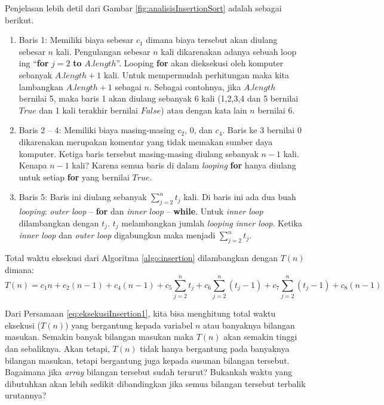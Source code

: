 \FloatBarrier
Penjelasan lebih detil dari Gambar \ref{fig:analisisInsertionSort} adalah sebagai berikut.
\begin{enumerate}
	\item Baris 1: Memiliki biaya sebesar $c_1$ dimana biaya tersebut akan diulang sebesar $n$ kali. Pengulangan sebesar $n$ kali dikarenakan adanya sebuah loop	ing ``\textbf{for} $j=2$ \textbf{to} $A.length$''. Looping \textbf{for} akan dieksekusi oleh komputer sebanyak $A.length+1$ kali. Untuk mempermudah perhitungan maka kita lambangkan $A.length+1$ sebagai $n$. Sebagai contohnya, jika $A.length$ bernilai 5, maka baris 1 akan diulang sebanyak 6 kali (1,2,3,4 dan 5 bernilai $True$ dan 1 kali terakhir bernilai $False$) atau dengan kata lain $n$ bernilai 6.
	\item Baris 2 -- 4: Memiliki biaya masing-masing $c_{2}$, 0, dan $c_{4}$. Baris ke 3 bernilai 0 dikarenakan merupakan komentar yang tidak memakan sumber daya komputer. Ketiga baris tersebut masing-masing diulang sebanyak $n-1$ kali. Kenapa $n-1$ kali? Karena semua baris di dalam \textit{looping} \textbf{for} hanya diulang untuk setiap \textbf{for} yang bernilai $True$.
	\item Baris 5: Baris ini diulang sebanyak $\sum\limits_{j=2}^n t_{j}$ kali. Di baris ini ada dua buah \textit{looping}: \textit{outer loop} -- \textbf{for} dan \textit{inner loop} -- \textbf{while}. Untuk \textit{inner loop} dilambangkan dengan $t_{j}$. $t_{j}$ melambangkan jumlah \textit{looping inner loop}. Ketika \textit{inner loop} dan \textit{outer loop} digabungkan maka menjadi $\sum\limits_{j=2}^n t_{j}$.  
\end{enumerate}                                       
                                     
Total waktu eksekusi dari Algoritma \ref{algo:insertion} dilambangkan dengan $T(n)$ dimana:
\begin{equation}
\label{eq:eksekusiInsertion1}
T(n) = c_{1}n + c_{2}(n-1) + c_{4}(n-1) + c_{5}\sum\limits_{j=2}^n t_{j} + c_{6}\sum\limits_{j=2}^n (t_{j}-1) + c_{7}\sum\limits_{j=2}^n (t_{j}-1) + c_{8}(n-1) 
\end{equation} 

Dari Persamaan \ref{eq:eksekusiInsertion1}, kita bisa menghitung total waktu eksekusi ($T(n)$) yang bergantung kepada variabel $n$ atau banyaknya bilangan masukan. Semakin banyak bilangan masukan maka $T(n)$ akan semakin tinggi dan sebaliknya. Akan tetapi, $T(n)$ tidak hanya bergantung pada banyaknya bilangan masukan, tetapi bergantung juga kepada susunan bilangan tersebut. Bagaimana jika \textit{array} bilangan tersebut sudah terurut? Bukankah waktu yang dibutuhkan akan lebih sedikit dibandingkan jika semua bilangan tersebut terbalik urutannya?

